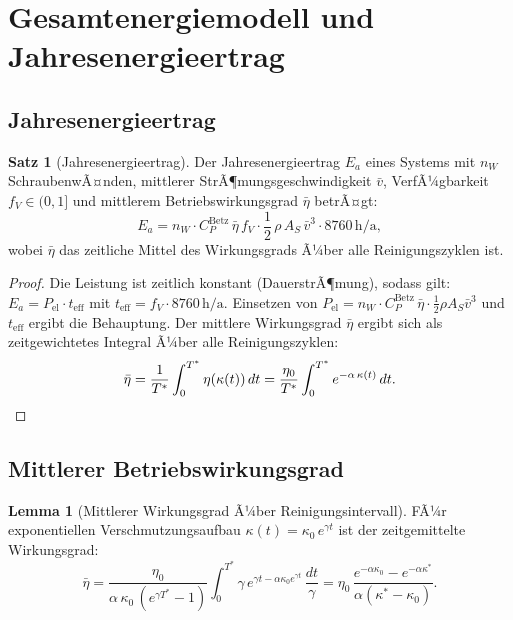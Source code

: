 ﻿\documentclass[a4paper,12pt]{article}
\theoremstyle{definition}
\newtheorem{satz}{Satz}
\newtheorem{lemma}{Lemma}
\begin{document}
\section{Gesamtenergiemodell und Jahresenergieertrag}

\subsection{Jahresenergieertrag}

\begin{satz}[Jahresenergieertrag]
\label{satz:jahresertrag}
Der Jahresenergieertrag $E_a$ eines Systems mit $n_W$ SchraubenwÃ¤nden, mittlerer
StrÃ¶mungsgeschwindigkeit $\bar{v}$, VerfÃ¼gbarkeit $f_V \in (0,1]$ und mittlerem
Betriebswirkungsgrad $\bar{\eta}$ betrÃ¤gt:
\[
  E_a = n_W \cdot C_P^{\mathrm{Betz}}\,\bar{\eta}\,f_V \cdot
        \frac{1}{2}\,\rho\,A_S\,\bar{v}^3 \cdot 8760\,\mathrm{h/a},
\]
wobei $\bar{\eta}$ das zeitliche Mittel des Wirkungsgrads Ã¼ber alle Reinigungszyklen ist.
\end{satz}

\begin{proof}
Die Leistung ist zeitlich konstant (DauerstrÃ¶mung), sodass gilt:
$E_a = P_{\mathrm{el}} \cdot t_{\mathrm{eff}}$ mit $t_{\mathrm{eff}} = f_V \cdot 8760\,\mathrm{h/a}$.
Einsetzen von $P_{\mathrm{el}} = n_W \cdot C_P^{\mathrm{Betz}}\,\bar{\eta} \cdot \frac{1}{2}\rho A_S \bar{v}^3$
und $t_{\mathrm{eff}}$ ergibt die Behauptung. Der mittlere Wirkungsgrad $\bar{\eta}$ ergibt
sich als zeitgewichtetes Integral Ã¼ber alle Reinigungszyklen:
\[
  \bar{\eta} = \frac{1}{T^*}\int_0^{T^*} \eta(\kappa(t))\,dt
             = \frac{\eta_0}{T^*}\int_0^{T^*} e^{-\alpha\,\kappa(t)}\,dt. \qedhere
\]
\end{proof}

\subsection{Mittlerer Betriebswirkungsgrad}

\begin{lemma}[Mittlerer Wirkungsgrad Ã¼ber Reinigungsintervall]
\label{lem:mittlerwirkungsgrad}
FÃ¼r exponentiellen Verschmutzungsaufbau $\kappa(t) = \kappa_0\,e^{\gamma t}$ ist
der zeitgemittelte Wirkungsgrad:
\[
  \bar{\eta} = \frac{\eta_0}{\alpha\,\kappa_0\,(e^{\gamma T^*} - 1)}
               \int_0^{T^*} \gamma\,e^{\gamma t - \alpha\kappa_0 e^{\gamma t}}\,\frac{dt}{\gamma}
             = \eta_0\,\frac{e^{-\alpha\kappa_0} - e^{-\alpha\kappa^*}}{\alpha(\kappa^* - \kappa_0)}.
\]
\end{lemma}
\end{document}
